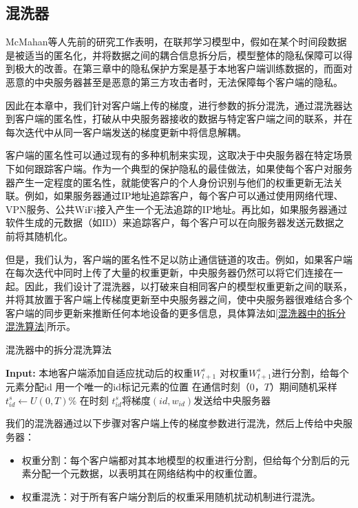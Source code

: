 \subsection{混洗器}
McMahan等人先前的研究工作表明，在联邦学习模型中，假如在某个时间段数据是被适当的匿名化，并将数据之间的耦合信息拆分后，模型整体的隐私保障可以得到极{}大的改善。在第三章中的隐私保护方案是基于本地客户端训练数据的，而面对恶意的中央服务器甚至是恶意的第三方攻击者时，无法保障每个客户端的隐私。

因此在本章中，我们针对客户端上传的梯度，进行参数的拆分混洗，通过混洗器达到客户端的匿名性，打破从中央服务器接收的数据与特定客户端之间的联系，并在每次迭代中从同一客户端发送的梯度更新中将信息解耦。

客户端的匿名性可以通过现有的多种机制来实现，这取决于中央服务器在特定场景下如何跟踪客户端。作为一个典型的保护隐私的最佳做法，如果使每个客户对服务器产生一定程度的匿名性，就能使客户的个人身份识别与他们的权重更新无法关联。例如，如果服务器通过IP地址追踪客户，每个客户可以通过使用网络代理、VPN服务、公共WiFi接入产生一个无法追踪的IP地址。再比如，如果服务器通过软件生成的元数据（如ID）来追踪客户，每个客户可以在向服务器发送元数据之前将其随机化。

但是，我们认为，客户端的匿名性不足以防止通信链道的攻击。例如，如果客户端在每次迭代中同时上传了大量的权重更新，中央服务器仍然可以将它们连接在一起。因此，我们设计了混洗器，以打破来自相同客户的模型权重更新之间的联系，并将其放置于客户端上传梯度更新至中央服务器之间，使中央服务器很难结合多个客户端的同步更新来推断任何本地设备的更多信息，具体算法如\ref{混洗器中的拆分混洗算法}所示。

\begin{algorithm}[!htb]
	\caption{混洗器中的拆分混洗算法}
	\label{混洗器中的拆分混洗算法}
	\begin{algorithmic}[1]
		\footnotesize
		\STATE \textbf{Input:} 本地客户端添加自适应扰动后的权重$W_{l+1}^{s}$
	    \STATE 对权重$W_{l+1}^{s}$进行分割，给每个元素分配id
	    \STATE 用一个唯一的id标记元素的位置
	    \STATE 在通信时刻（0，$T$）期间随机采样$t_{i d}^{s} \leftarrow U(0, T) \%$
	    \ENDFOR
	    \STATE 在时刻 $t_{i d}^{s}$将梯度$(i d, w_{i d})$发送给中央服务器
	\end{algorithmic}
\end{algorithm}

我们的混洗器通过以下步骤对客户端上传的梯度参数进行混洗，然后上传给中央服务器：
\begin{itemize}
	\item 权重分割：每个客户端都对其本地模型的权重进行分割，但给每个分割后的元素分配一个元数据，以表明其在网络结构中的权重位置。
	\item 权重混洗：对于所有客户端分割后的权重采用随机扰动机制进行混洗。
\end{itemize}

